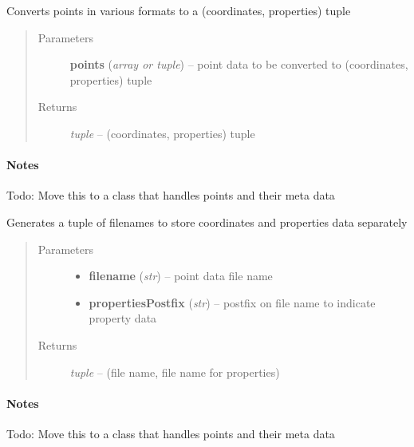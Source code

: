 \documentclass[letterpaper,10pt,english]{sphinxmanual}
\begin{document}

\begin{fulllineitems}
\label{api/ClearMap.IO:ClearMap.IO.IO.pointsToCoordinatesAndProperties}
Converts points in various formats to a (coordinates, properties) tuple
\begin{quote}\begin{description}
\item[{Parameters}] \leavevmode
\textbf{points} (\emph{array or tuple}) --
point data to be converted to (coordinates, properties) tuple

\item[{Returns}] \leavevmode
\emph{tuple} --
(coordinates, properties) tuple

\end{description}\end{quote}
\paragraph{Notes}

Todo: Move this to a class that handles points and their meta data

\end{fulllineitems}


\begin{fulllineitems}
\label{api/ClearMap.IO:ClearMap.IO.IO.pointsToCoordinatesAndPropertiesFileNames}
Generates a tuple of filenames to store coordinates and properties data separately
\begin{quote}\begin{description}
\item[{Parameters}] \leavevmode\begin{itemize}
\item {} 
\textbf{filename} (\emph{str}) --
point data file name

\item {} 
\textbf{propertiesPostfix} (\emph{str}) --
postfix on file name to indicate property data

\end{itemize}

\item[{Returns}] \leavevmode
\emph{tuple} --
(file name, file name for properties)

\end{description}\end{quote}
\paragraph{Notes}

Todo: Move this to a class that handles points and their meta data

\end{fulllineitems}
\end{document}

